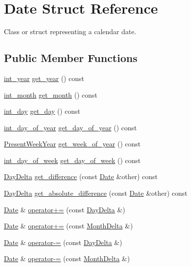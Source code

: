 \hypertarget{structDate}{\section{\-Date \-Struct \-Reference}
\label{structDate}
}


\-Class or struct representing a calendar date.  


\subsection*{\-Public \-Member \-Functions}
\begin{DoxyCompactItemize}
\item 
\hyperlink{types_8h_a5b021e50b656f4efcc69340c01a17997}{int\-\_\-year} \hyperlink{structDate_a970cb8375d137e19cea4c042a0b8d64a}{get\-\_\-year} () const 
\item 
\hyperlink{types_8h_ae68f4f515f242b927830881ea4cffae2}{int\-\_\-month} \hyperlink{structDate_afa1025e5868c30b20b1ff1481e30f08d}{get\-\_\-month} () const 
\item 
\hyperlink{types_8h_a5269b564286b0eecff0b944afb81d4e2}{int\-\_\-day} \hyperlink{structDate_a044d6531a4335e3136f7aedd67fc0db0}{get\-\_\-day} () const 
\item 
\hyperlink{types_8h_aaaf288114a6279e071420e8e20324b13}{int\-\_\-day\-\_\-of\-\_\-year} \hyperlink{structDate_af19ad4f968f7799a336d2112c784bc9b}{get\-\_\-day\-\_\-of\-\_\-year} () const 
\item 
\hyperlink{structPresentWeekYear}{\-Present\-Week\-Year} \hyperlink{structDate_a138ce231feac1890d4e69d253e0e8e8c}{get\-\_\-week\-\_\-of\-\_\-year} () const 
\item 
\hyperlink{types_8h_a8132950de7fc3f98373a4d384d8b6eca}{int\-\_\-day\-\_\-of\-\_\-week} \hyperlink{structDate_ad5ff9ecae53c65ba2b45dc4f69f37d5c}{get\-\_\-day\-\_\-of\-\_\-week} () const 
\item 
\hyperlink{structDayDelta}{\-Day\-Delta} \hyperlink{structDate_ae175df5ffb7f12378d41453209994e59}{get\-\_\-difference} (const \hyperlink{structDate}{\-Date} \&other) const 
\item 
\hyperlink{structDayDelta}{\-Day\-Delta} \hyperlink{structDate_a293adccbbf2f42bd54dde9fb0de81f92}{get\-\_\-absolute\-\_\-difference} (const \hyperlink{structDate}{\-Date} \&other) const 
\item 
\hyperlink{structDate}{\-Date} \& \hyperlink{structDate_a0a5674bd1757acf8b229a8448c200bf7}{operator+=} (const \hyperlink{structDayDelta}{\-Day\-Delta} \&)
\item 
\hyperlink{structDate}{\-Date} \& \hyperlink{structDate_ad5a2f681fdc34cbff1511fd7e6dd6f91}{operator+=} (const \hyperlink{structMonthDelta}{\-Month\-Delta} \&)
\item 
\hyperlink{structDate}{\-Date} \& \hyperlink{structDate_a43159e68f1bceedbb169931b85feeee8}{operator-\/=} (const \hyperlink{structDayDelta}{\-Day\-Delta} \&)
\item 
\hyperlink{structDate}{\-Date} \& \hyperlink{structDate_ac7b9e1798bc482f9847d6f87921e4975}{operator-\/=} (const \hyperlink{structMonthDelta}{\-Month\-Delta} \&)
\end{DoxyCompactItemize}
